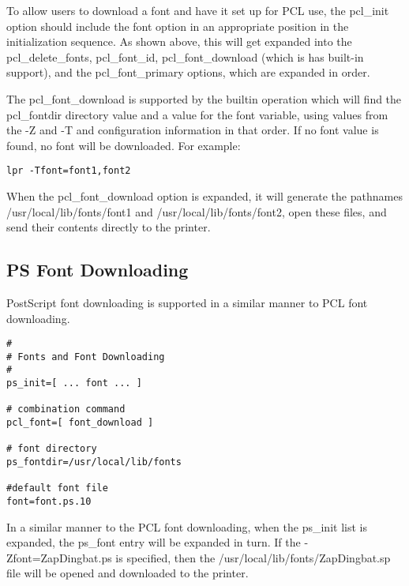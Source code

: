 \documentclass[a4paper]{article}
\begin{document}
To allow users to download a font and have it set up for PCL use,
the 
{\ttfamily pcl\_init}
option should include the
{\ttfamily font}
option in an appropriate position in the initialization sequence.
As shown above,
this will get expanded into the
{\ttfamily pcl\_delete\_fonts},
{\ttfamily pcl\_font\_id},
{\ttfamily pcl\_font\_download} (which is has built-in support),
and the
{\ttfamily pcl\_font\_primary}
options,
which are expanded in order.

The
{\ttfamily pcl\_font\_download} is supported by the builtin operation which will
find the
{\ttfamily pcl\_fontdir}
directory value
and a value for the
{\ttfamily font}
variable,
using values from the
{\ttfamily -Z}
and
{\ttfamily -T}
and configuration information in that order.
If no
{\ttfamily font}
value is found,
no font will be downloaded.
For example:
\begin{tscreen}
\begin{verbatim}
lpr -Tfont=font1,font2
\end{verbatim}
\end{tscreen}


When the
{\ttfamily pcl\_font\_download}
option is expanded,
it will generate the pathnames
{\ttfamily /usr/local/lib/fonts/font1}
and
{\ttfamily /usr/local/lib/fonts/font2},
open these files,
and send their contents directly to the printer.


\subsection{PS Font Downloading}

PostScript font downloading is supported in a similar manner to
PCL font downloading.
\begin{tscreen}
\begin{verbatim}
#
# Fonts and Font Downloading
# 
ps_init=[ ... font ... ]

# combination command
pcl_font=[ font_download ]

# font directory
ps_fontdir=/usr/local/lib/fonts

#default font file
font=font.ps.10
\end{verbatim}
\end{tscreen}


In a similar manner to the PCL font downloading,
when the
{\ttfamily ps\_init}
list is expanded,
the
{\ttfamily ps\_font}
entry will be expanded in turn.
If the {\ttfamily -Zfont=ZapDingbat.ps} is specified,
then the
{\ttfamily /usr/local/lib/fonts/ZapDingbat.sp}
file will be opened and downloaded to the printer.
\end{document}
